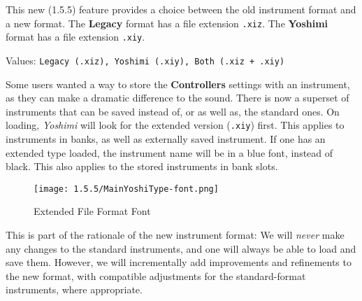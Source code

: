 
   This new (1.5.5) feature provides a choice between the old instrument
   format and a new format.
   The \textbf{Legacy} format has a file extension \texttt{.xiz}.
   The \textbf{Yoshimi} format has a file extension \texttt{.xiy}.

   Values: \texttt{Legacy (.xiz), Yoshimi (.xiy), Both (.xiz + .xiy)}

   Some users wanted a way to store the \textbf{Controllers} settings
   with an instrument, as they can make a dramatic difference to the
   sound. There is now a superset of instruments that can be saved instead
   of, or as well as, the standard ones. On loading, \textsl{Yoshimi}
   will look for the extended version (\texttt{.xiy}) first.
   This applies to instruments in banks, as well as
   externally saved instrument.
   If one has an extended type loaded, the instrument
   name will be in a blue font, instead of black.
   This also applies to the stored instruments in bank slots.

\begin{figure}[H]
   \centering
   \texttt{[image: 1.5.5/MainYoshiType-font.png]}
   \caption[Yoshimi Font for Extended File Format]{Extended File Format Font}
   \label{fig:extended_file_format_font}
\end{figure}

   This is part of the rationale of the new instrument format: We will
   \textsl{never} make any changes to the standard instruments, and one will always
   be able to load and save them. However, we will incrementally add improvements
   and refinements to the new format, with compatible
   adjustments for the standard-format instruments, where appropriate.

